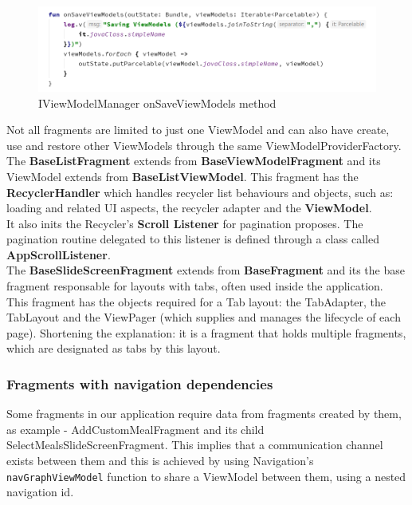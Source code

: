 \begin{figure}[H]
    \begin{center}
        \includegraphics[scale=0.5]{_figures/onSaveViewModelManager.png}
        \caption{IViewModelManager onSaveViewModels method}
    \end{center}
\end{figure}

Not all fragments are limited to just one ViewModel and can also have create, use and restore other ViewModels through the same 
ViewModelProviderFactory.\\

The \textbf{BaseListFragment} extends from \textbf{BaseViewModelFragment} and its ViewModel extends from \textbf{BaseListViewModel}.
This fragment has the \textbf{RecyclerHandler} which handles recycler list behaviours and objects, such as: loading and related UI aspects,
the recycler adapter and the \textbf{ViewModel}.\\

It also inits the Recycler's \textbf{Scroll Listener} for pagination proposes. The pagination routine delegated to this listener is defined 
through a class called \textbf{AppScrollListener}.\\

The \textbf{BaseSlideScreenFragment} extends from \textbf{BaseFragment} and its the base fragment responsable for layouts with tabs, often
used inside the application. This fragment has the objects required for a Tab layout: the TabAdapter, the TabLayout and the ViewPager (which
supplies and manages the lifecycle of each page). Shortening the explanation: it is a fragment that holds multiple fragments, 
which are designated as tabs by this layout.\\

\subsubsection{Fragments with navigation dependencies}

Some fragments in our application require data from fragments created by them, as example - 
AddCustomMealFragment and its child SelectMealsSlideScreenFragment. 
This implies that a communication channel exists between
them and this is achieved by using Navigation's \texttt{navGraphViewModel}\cite{navgraph} function to share a ViewModel between them,
using a nested navigation id\cite{nestedNav}.\\

